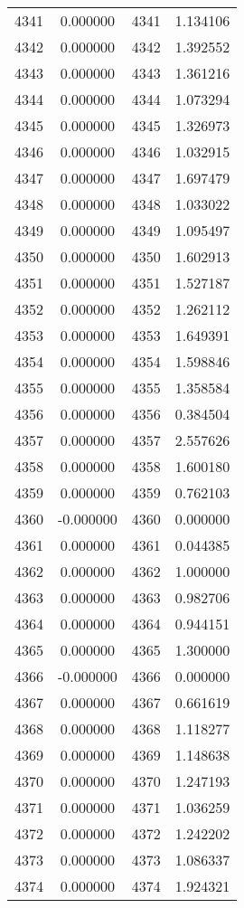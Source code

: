 \documentclass[12pt]{article}
\begin{document}
\begin{longtable}{@{}cccc@{}}
4341 & 0.000000 & 4341 & 1.134106 \\
4342 & 0.000000 & 4342 & 1.392552 \\
4343 & 0.000000 & 4343 & 1.361216 \\
4344 & 0.000000 & 4344 & 1.073294 \\
4345 & 0.000000 & 4345 & 1.326973 \\
4346 & 0.000000 & 4346 & 1.032915 \\
4347 & 0.000000 & 4347 & 1.697479 \\
4348 & 0.000000 & 4348 & 1.033022 \\
4349 & 0.000000 & 4349 & 1.095497 \\
4350 & 0.000000 & 4350 & 1.602913 \\
4351 & 0.000000 & 4351 & 1.527187 \\
4352 & 0.000000 & 4352 & 1.262112 \\
4353 & 0.000000 & 4353 & 1.649391 \\
4354 & 0.000000 & 4354 & 1.598846 \\
4355 & 0.000000 & 4355 & 1.358584 \\
4356 & 0.000000 & 4356 & 0.384504 \\
4357 & 0.000000 & 4357 & 2.557626 \\
4358 & 0.000000 & 4358 & 1.600180 \\
4359 & 0.000000 & 4359 & 0.762103 \\
4360 & -0.000000 & 4360 & 0.000000 \\
4361 & 0.000000 & 4361 & 0.044385 \\
4362 & 0.000000 & 4362 & 1.000000 \\
4363 & 0.000000 & 4363 & 0.982706 \\
4364 & 0.000000 & 4364 & 0.944151 \\
4365 & 0.000000 & 4365 & 1.300000 \\
4366 & -0.000000 & 4366 & 0.000000 \\
4367 & 0.000000 & 4367 & 0.661619 \\
4368 & 0.000000 & 4368 & 1.118277 \\
4369 & 0.000000 & 4369 & 1.148638 \\
4370 & 0.000000 & 4370 & 1.247193 \\
4371 & 0.000000 & 4371 & 1.036259 \\
4372 & 0.000000 & 4372 & 1.242202 \\
4373 & 0.000000 & 4373 & 1.086337 \\
4374 & 0.000000 & 4374 & 1.924321 \\

\end{longtable}
\end{document}
